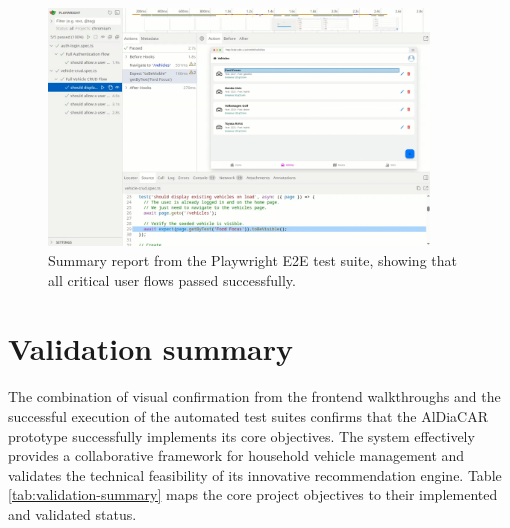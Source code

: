 \begin{figure}[H]
    \centering
    \includegraphics[width=0.9\textwidth]{images/results/playwright_test_results.png}
    \caption{Summary report from the Playwright E2E test suite, showing that all critical user flows passed successfully.}
    \label{fig:playwright-results}
\end{figure}

\section{Validation summary}
The combination of visual confirmation from the frontend walkthroughs and the successful execution of the automated test suites confirms that the AlDiaCAR prototype successfully implements its core objectives. The system effectively provides a collaborative framework for household vehicle management and validates the technical feasibility of its innovative recommendation engine. Table \ref{tab:validation-summary} maps the core project objectives to their implemented and validated status.

\begin{table}[H]
    \centering
    \caption{Summary of validated project objectives}
    \label{tab:validation-summary}
\end{table}
